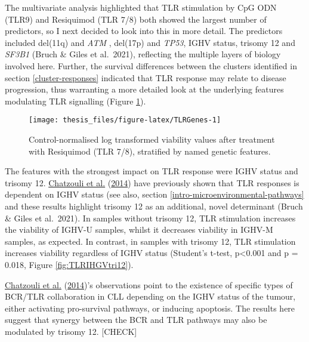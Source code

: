 \documentclass[11pt, a4paper, twosided]{book}
\begin{document}
The multivariate analysis highlighted that TLR stimulation by CpG ODN (TLR9) and Resiquimod (TLR 7/8) both showed the largest number of predictors, so I next decided to look into this in more detail. The predictors included del(11q) and \emph{ATM} , del(17p) and \emph{TP53}, IGHV status, trisomy 12 and \emph{SF3B1} (Bruch \& Giles et al.~2021), reflecting the multiple layers of biology involved here. Further, the survival differences between the clusters identified in section \ref{cluster-responses} indicated that TLR response may relate to disease progression, thus warranting a more detailed look at the underlying features modulating TLR signalling (Figure \ref{fig:TLRGenes}).


\begin{figure}

{\centering \texttt{[image: thesis\_files/figure-latex/TLRGenes-1]} 

}

\caption{Control-normalised log transformed viability values after treatment with Resiquimod (TLR 7/8), stratified by named genetic features.}\label{fig:TLRGenes}
\end{figure}
The features with the strongest impact on TLR response were IGHV status and trisomy 12. \protect\hyperlink{ref-Chatzouli2014}{Chatzouli et al.} (\protect\hyperlink{ref-Chatzouli2014}{2014}) have previously shown that TLR responses is dependent on IGHV status (see also, section \ref{intro-microenvironmental-pathways} and these results highlight trisomy 12 as an additional, novel determinant (Bruch \& Giles et al.~2021). In samples without trisomy 12, TLR stimulation increases the viability of IGHV-U samples, whilst it decreases viability in IGHV-M samples, as expected. In contrast, in samples with trisomy 12, TLR stimulation increases viability regardless of IGHV status (Student's t-test, p\textless0.001 and p = 0.018, Figure \ref{fig:TLRIHGVtri12}).

\protect\hyperlink{ref-Chatzouli2014}{Chatzouli et al.} (\protect\hyperlink{ref-Chatzouli2014}{2014})'s observations point to the existence of specific types of BCR/TLR collaboration in CLL depending on the IGHV status of the tumour, either activating pro-survival pathways, or inducing apoptosis. The results here suggest that synergy between the BCR and TLR pathways may also be modulated by trisomy 12. {[}CHECK{]}
\end{document}
